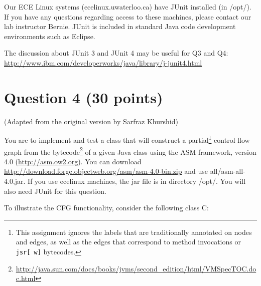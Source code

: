 \documentclass[10pt]{article}
\begin{document}
{Our ECE Linux systems (ecelinux.uwaterloo.ca)  have JUnit installed (in  /opt/). If you have any questions regarding access to these machines, please contact our lab instructor Bernie. 
JUnit is included in standard Java code development environments such as Eclipse.

The discussion about JUnit 3 and JUnit 4 may be useful for Q3 and Q4:\\ \url{http://www.ibm.com/developerworks/java/library/j-junit4.html}

\section*{Question 4 (30 points)} 

(Adapted from the original version by Sarfraz Khurshid)

You are to implement and test a class that will construct a partial\footnote{This assignment ignores the labels that are traditionally annotated 
on nodes and edges, as well as the edges that correspond to method invocations or {\tt jsr[ w]} bytecodes.} 
control-flow graph from the bytecode\footnote{\url{http://java.sun.com/docs/books/jvms/second_edition/html/VMSpecTOC.doc.html}} of a given
Java class using the ASM framework, version 4.0 (\url{http://asm.ow2.org}). 
You can download \url{http://download.forge.objectweb.org/asm/asm-4.0-bin.zip} and use all/asm-all-4.0.jar.
If you use ecelinux machines, the jar file is in directory /opt/. 
You will also need JUnit for this question.


To illustrate the CFG functionality, consider the following class C:

}
\end{document}
